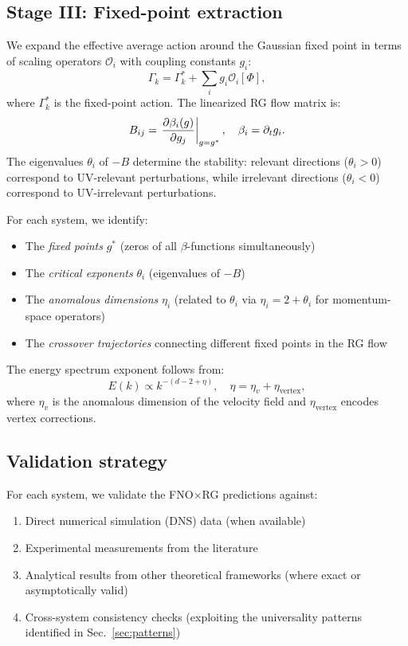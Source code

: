 \subsection{Stage III: Fixed-point extraction\label{subsec:stage3}}

We expand the effective average action around the Gaussian fixed point in terms of scaling operators $\mathcal{O}_i$ with coupling constants $g_i$:
\begin{equation}
\Gamma_k = \Gamma_k^* + \sum_i g_i \mathcal{O}_i[\Phi],
\end{equation}
where $\Gamma_k^*$ is the fixed-point action. The linearized RG flow matrix is:
\begin{equation}\label{eq:flow_matrix}
B_{ij} = \left.\frac{\partial \beta_i(g)}{\partial g_j}\right|_{g=g^*}, \quad \beta_i = \partial_t g_i.
\end{equation}
The eigenvalues $\theta_i$ of $-B$ determine the stability: relevant directions ($\theta_i > 0$) correspond to UV-relevant perturbations, while irrelevant directions ($\theta_i < 0$) correspond to UV-irrelevant perturbations.

For each system, we identify:
\begin{itemize}
\item The \emph{fixed points} $g^*$ (zeros of all $\beta$-functions simultaneously)
\item The \emph{critical exponents} $\theta_i$ (eigenvalues of $-B$)
\item The \emph{anomalous dimensions} $\eta_i$ (related to $\theta_i$ via $\eta_i = 2 + \theta_i$ for momentum-space operators)
\item The \emph{crossover trajectories} connecting different fixed points in the RG flow
\end{itemize}

The energy spectrum exponent follows from:
\begin{equation}\label{eq:spectrum_exponent}
E(k) \propto k^{-(d-2+\eta)}, \quad \eta = \eta_v + \eta_{\mathrm{vertex}},
\end{equation}
where $\eta_v$ is the anomalous dimension of the velocity field and $\eta_{\mathrm{vertex}}$ encodes vertex corrections.

\subsection{Validation strategy}

For each system, we validate the FNO$\times$RG predictions against:
\begin{enumerate}
\item Direct numerical simulation (DNS) data (when available)
\item Experimental measurements from the literature
\item Analytical results from other theoretical frameworks (where exact or asymptotically valid)
\item Cross-system consistency checks (exploiting the universality patterns identified in Sec.~\ref{sec:patterns})
\end{enumerate}

